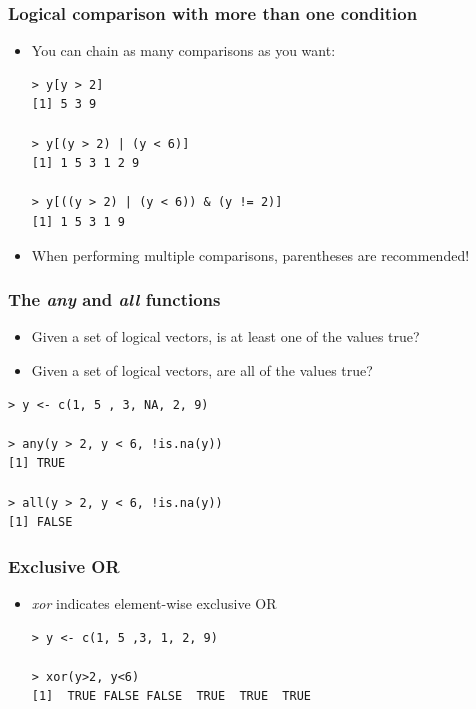 \documentclass[xcolor=dvipsnames, xcolor=table]{beamer} %
\theoremstyle{mystyle}
\begin{document}
\begin{frame}[fragile] %
\frametitle{Logical comparison with more than one condition}

\begin{itemize}

\item You can  chain as many comparisons as you want:

\begin{verbatim}
> y[y > 2]
[1] 5 3 9

> y[(y > 2) | (y < 6)]
[1] 1 5 3 1 2 9

> y[((y > 2) | (y < 6)) & (y != 2)]
[1] 1 5 3 1 9
\end{verbatim}

\item When performing multiple comparisons, parentheses are recommended!

\end{itemize}

\end{frame}

\begin{frame}[fragile] %
\frametitle{The \textit{any} and \textit{all} functions}

\begin{itemize}
\item Given a set of logical vectors, is at least one of the values true?
\item Given a set of logical vectors, are all of the values true?
\end{itemize}

\begin{verbatim}
> y <- c(1, 5 , 3, NA, 2, 9)

> any(y > 2, y < 6, !is.na(y))
[1] TRUE

> all(y > 2, y < 6, !is.na(y))
[1] FALSE
\end{verbatim}

\end{frame}

\begin{frame}[fragile] %
\frametitle{Exclusive OR}

\begin{itemize}
\item \textit{xor} indicates element-wise exclusive OR
\begin{verbatim}
> y <- c(1, 5 ,3, 1, 2, 9)

> xor(y>2, y<6)
[1]  TRUE FALSE FALSE  TRUE  TRUE  TRUE
\end{verbatim}

\end{itemize}

\end{frame}
\end{document}
